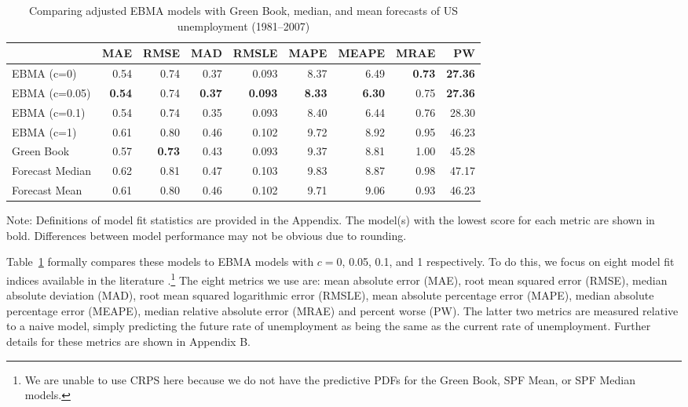 \documentclass[12pt,fullpage,endnotes]{article}
\begin{document}
\begin{table}[h]
\caption{Comparing adjusted EBMA models with Green Book, median, and mean forecasts of US unemployment (1981--2007)}
\begin{center}
\begin{tabular}{lrrrrrrrr}
\toprule
 & MAE & RMSE & MAD & RMSLE & MAPE & MEAPE & MRAE & PW \\ 
\midrule
 EBMA (c=0)& 0.54 & 0.74 & 0.37 & 0.093 & 8.37 & 6.49 & \textbf{0.73} & \textbf{27.36} \\ 
  EBMA (c=0.05)& \textbf{0.54} & 0.74 &\textbf{ 0.37} & \textbf{0.093} & \textbf{8.33} & \textbf{6.30} & 0.75 & \textbf{27.36} \\ 
 EBMA (c=0.1)& 0.54 & 0.74 & 0.35 & 0.093 & 8.40 & 6.44 & 0.76 & 28.30 \\ 
EBMA (c=1) & 0.61 & 0.80 & 0.46 & 0.102 & 9.72 & 8.92 & 0.95 & 46.23 \\ 
 Green Book& 0.57 & \textbf{0.73} & 0.43 & 0.093 & 9.37 & 8.81 & 1.00 & 45.28 \\ 
 Forecast Median& 0.62 & 0.81 & 0.47 & 0.103 & 9.83 & 8.87 & 0.98 & 47.17 \\ 
Forecast Mean& 0.61 & 0.80 & 0.46 & 0.102 & 9.71 & 9.06 & 0.93 & 46.23 \\ 
\bottomrule
\end{tabular}
\end{center}


\label{compareTable1}
Note: Definitions of model fit statistics are provided in the Appendix. The model(s) with the lowest score for each metric are shown in bold.  Differences between model performance may not be obvious due to rounding.
\end{table}


Table~\ref{compareTable1} formally compares these models to
EBMA models with $c=$0, 0.05, 0.1, and 1 respectively.  To do this, we
focus on eight model fit indices available in the literature
\citep{brandt:freeman:schrodt:2011}.\footnote{We are unable to use
  CRPS here because we do not have the predictive PDFs for the Green
  Book, SPF Mean, or SPF Median models.}  The eight metrics we use are:
mean absolute error (MAE), root mean squared error (RMSE), median
absolute deviation (MAD), root mean squared logarithmic error (RMSLE),
mean absolute percentage error (MAPE), median absolute percentage
error (MEAPE), median relative absolute error (MRAE) and percent worse
(PW).  The latter two metrics are measured relative to a naive model,
simply predicting the future rate of unemployment as being the same as
the current rate of unemployment.  Further details for these metrics
are shown in Appendix B.
\end{document}
